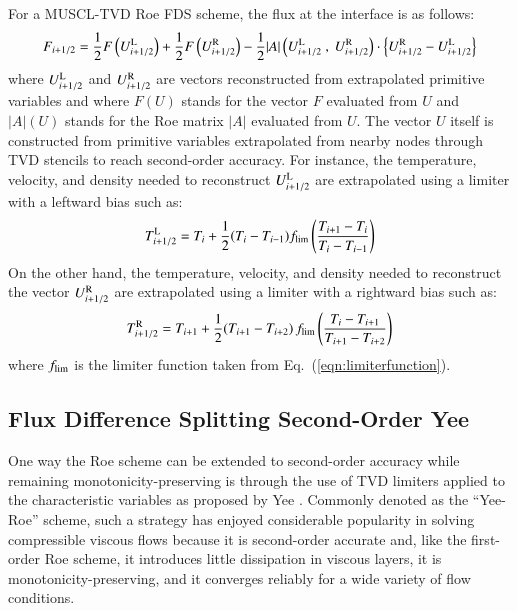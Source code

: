 \documentclass{warpdoc}
\newcommand{\mfd}{\displaystyle}
\begin{document}
For a MUSCL-TVD Roe FDS scheme, the flux at the interface is as follows:
%
\begin{equation}
F_{i+1/2}=\frac{1}{2} F\left(U^{\rm L}_{i+1/2}\right) + \frac{1}{2} F\left(U^{\rm R}_{i+1/2} \right) - \frac{1}{2}|A|\left(U^{\rm L}_{i+1/2}~,~U^{\rm R}_{i+1/2}\right) \cdot \left\{U^{\rm R}_{i+1/2}-U^{\rm L}_{i+1/2}\right\}
\label{eqn:FDS_2o_MUSCL}
\end{equation}
%
where $U^{\rm L}_{i+1/2}$ and $U^{\rm R}_{i+1/2}$ are vectors reconstructed from extrapolated primitive variables and where $F(U)$ stands for the vector $F$ evaluated from $U$ and $|A|(U)$ stands for the Roe matrix $|A|$ evaluated from $U$. The vector $U$ itself is constructed from primitive variables extrapolated from nearby nodes through TVD stencils to reach second-order accuracy. For instance, the temperature, velocity, and density needed to reconstruct $U^{\rm L}_{i+1/2}$ are extrapolated using a limiter with a leftward bias such as:
%
\begin{equation}
T^{\rm L}_{i+1/2}=T_i + \mfd\frac{1}{2}(T_i-T_{i-1}) f_{\rm lim}\left(\frac{T_{i+1}-T_i}{T_i-T_{i-1}}   \right)
\end{equation}
%
On the other hand, the temperature, velocity, and density needed to reconstruct the vector $U^{\rm R}_{i+1/2}$ are extrapolated using a limiter with a rightward bias such as: 
%
\begin{equation}
T^{\rm R}_{i+1/2}=T_{i+1} + \mfd\frac{1}{2}(T_{i+1}-T_{i+2}) \, f_{\rm lim}\left(\frac{T_{i}-T_{i+1}}{T_{i+1}-T_{i+2}}  \right) 
\end{equation}
%
where $f_{\rm lim}$ is the limiter function taken from Eq.\ (\ref{eqn:limiterfunction}).





\subsection{Flux Difference Splitting Second-Order Yee}

One way the Roe scheme can be extended to second-order accuracy while remaining monotonicity-preserving is through the use of TVD limiters applied to the characteristic variables as proposed by Yee \cite{jcp:1990:yee}. Commonly denoted as the ``Yee-Roe'' scheme, such a strategy has enjoyed considerable popularity in solving compressible viscous flows because it is second-order accurate and, like the first-order Roe scheme, it introduces little dissipation in viscous layers, it is monotonicity-preserving, and it converges reliably for a wide variety of flow conditions.  
\end{document}
